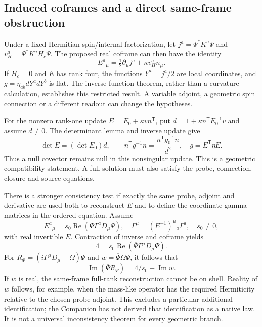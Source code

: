\subsection{Induced coframes and a direct same-frame obstruction}
Under a fixed Hermitian spin/internal factorization, let
$j^a=\Psi^*K^a\Psi$ and
$v_H^a=\Psi^*K^aH_c\Psi$. The proposed real coframe can then
have the identity
\begin{equation}
 E^a{}_{\mu}=\tfrac12\partial_\mu j^a+\kappa v_H^a n_\mu.
\end{equation}
If $H_c=0$ and $E$ has rank four, the functions $Y^a=j^a/2$
are local coordinates, and $g=\eta_{ab}dY^a dY^b$ is flat.
The inverse function theorem, rather than a curvature calculation,
establishes this restricted result. A variable adjoint, a geometric
spin connection or a different readout can change the hypotheses.

For the nonzero rank-one update $E=E_0+\kappa v n^{\mathsf T}$,
put $d=1+\kappa n^{\mathsf T}E_0^{-1}v$ and assume $d\ne0$.
The determinant lemma and inverse update give
\begin{equation}
 \det E=(\det E_0)d,\qquad
 n^{\mathsf T}g^{-1}n=
       \frac{n^{\mathsf T}g_0^{-1}n}{d^2},
 \quad g=E^{\mathsf T}\eta E.
\end{equation}
Thus a null covector remains null in this nonsingular update. This
is a geometric compatibility statement. A full solution must also
satisfy the probe, connection, closure and source equations.

There is a stronger consistency test if exactly the same probe,
adjoint and derivative are used both to reconstruct $E$ and to
define the coordinate gamma matrices in the ordered equation. Assume
\begin{equation}
 E^a{}_{\mu}=s_0\operatorname{Re}(\overline\Psi\Gamma^aD_\mu\Psi),
 \quad \Gamma^\mu=(E^{-1})^\mu{}_a\Gamma^a,\quad s_0\ne0,
\end{equation}
with real invertible $E$. Contraction of inverse and coframe yields
\begin{equation}
 4=s_0\operatorname{Re}(\overline\Psi\Gamma^\mu D_\mu\Psi).
\end{equation}
For $R_\Psi=(i\Gamma^\mu D_\mu-\Omega)\Psi$ and
$w=\overline\Psi\Omega\Psi$, it follows that
\begin{equation}
 \operatorname{Im}(\overline\Psi R_\Psi)=4/s_0-\operatorname{Im}w.
\end{equation}
If $w$ is real, the same-frame full-rank reconstruction cannot be
on shell. Reality of $w$ follows, for example, when the mass-like
operator has the required Hermiticity relative to the chosen probe
adjoint. This excludes a particular additional identification; the
Companion has not derived that identification as a native law. It
is not a universal inconsistency theorem for every geometric branch.

